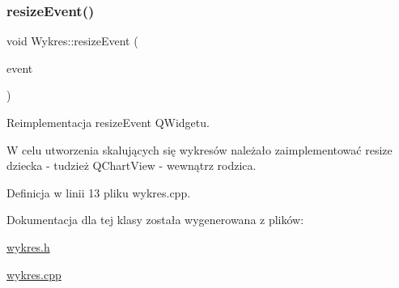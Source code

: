 \subsubsection{\texorpdfstring{resize\+Event()}{resizeEvent()}}
{\footnotesize\ttfamily void Wykres\+::resize\+Event (\begin{DoxyParamCaption}\item[{Q\+Resize\+Event $\ast$}]{event }\end{DoxyParamCaption})\hspace{0.3cm}{\ttfamily [protected]}}



Reimplementacja resize\+Event Q\+Widgetu. 

W celu utworzenia skalujących się wykresów należało zaimplementować resize dziecka -\/ tudzież Q\+Chart\+View -\/ wewnątrz rodzica. 

Definicja w linii 13 pliku wykres.\+cpp.



Dokumentacja dla tej klasy została wygenerowana z plików\+:\begin{DoxyCompactItemize}
\item 
\hyperlink{wykres_8h}{wykres.\+h}\item 
\hyperlink{wykres_8cpp}{wykres.\+cpp}\end{DoxyCompactItemize}
